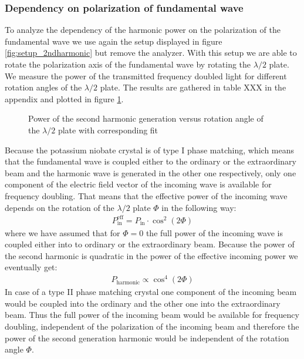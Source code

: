 \documentclass{protokoll_en}
\begin{document}
\subsubsection{Dependency on polarization of fundamental wave}\label{subsubsec:ana_pol_dep}
To analyze the dependency of the harmonic power on the polarization of the fundamental wave we use again the setup displayed in figure \ref{fig:setup_2ndharmonic} but remove the analyzer. With this setup we are able to rotate the polarization axis of the fundamental wave by rotating the $\lambda / 2$ plate. We measure the power of the transmitted frequency doubled light for different rotation angles of the $\lambda / 2$ plate. The results are gathered in table XXX in the appendix and plotted in figure \ref{fig:ana_pol_dep}.
\begin{figure}[H]
  \resizebox{0.8\textwidth}{!}{
     
}
  \caption{Power of the second harmonic generation versus rotation angle of the $\lambda / 2$ plate with corresponding fit}
  \label{fig:ana_pol_dep}
\end{figure}
Because the potassium niobate crystal is of type I phase matching, which means that the fundamental wave is coupled either to the ordinary or the extraordinary beam and the harmonic wave is generated in the other one respectively, only one component of the electric field vector of the incoming wave is available for frequency doubling. That means that the effective power of the incoming wave depends on the rotation of the $\lambda / 2$ plate $\Phi$ in the following way:
\begin{align*}
P_\textrm{in}^\textrm{eff}=P_\textrm{in} \cdotp \cos^2\left(2\Phi\right)
\end{align*}
where we have assumed that for $\Phi = 0$ the full power of the incoming wave is coupled either into to ordinary or the extraordinary beam. Because the power of the second harmonic is quadratic in the power of the effective incoming power we eventually get:
\begin{align}
\label{eq:ana_type1}
P_\textrm{harmonic}\propto \cos^4\left(2\Phi\right)
\end{align}
In case of a type II phase matching crystal one component of the incoming beam would be coupled into the ordinary and the other one into the extraordinary beam. Thus the full power of the incoming beam would be available for frequency doubling, independent of the polarization of the incoming beam and therefore the power of the second generation harmonic would be independent of the rotation angle $\Phi$.
\end{document}
